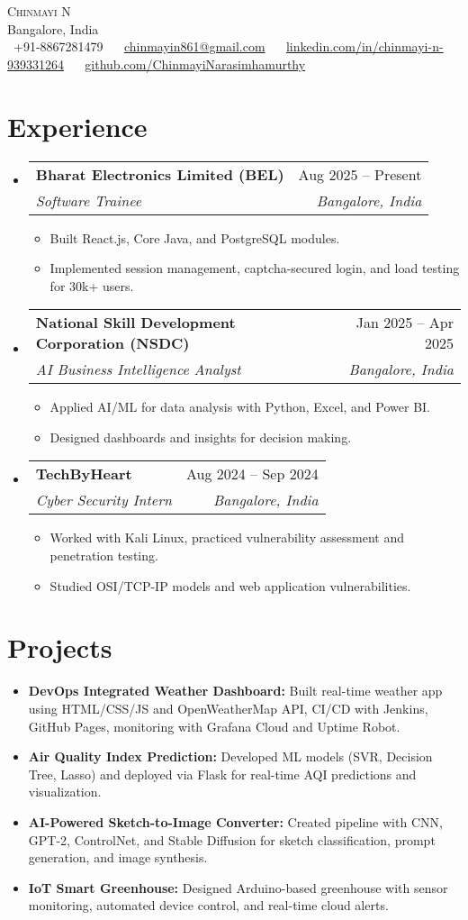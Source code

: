 \documentclass[a4paper,10pt]{article}
\makeatletter
\newcommand{\resumeItem}[1]{\item\small{#1}}
\newcommand{\resumeSubheading}[4]{
  \vspace{-1pt}\item
    \begin{tabular*}{0.97\textwidth}{l@{\extracolsep{\fill}}r}
      \textbf{#1} & #2 \\
      \textit{#3} & \textit{#4} \\
    \end{tabular*}\vspace{-5pt}
}
\newcommand{\resumeSubHeadingListStart}{\begin{itemize}[leftmargin=*]}
\newcommand{\resumeSubHeadingListEnd}{\end{itemize}}
\newcommand{\resumeItemListStart}{\begin{itemize}[label=\raisebox{0.25ex}{\tiny$\bullet$}]}
\newcommand{\resumeItemListEnd}{\end{itemize}\vspace{-5pt}}
\makeatother
\begin{document}
\begin{center}
    {\Huge \scshape Chinmayi N} \\ \vspace{2pt}
    Bangalore, India \\ \vspace{2pt}
    \scriptsize
    \faPhone\ +91-8867281479 ~ 
    \faEnvelope\ \href{mailto:chinmayin861@gmail.com}{chinmayin861@gmail.com} ~
    \faLinkedin\ \href{https://linkedin.com/in/chinmayi-n-939331264}{linkedin.com/in/chinmayi-n-939331264} ~
    \faGithub\ \href{https://github.com/ChinmayiNarasimhamurthy}{github.com/ChinmayiNarasimhamurthy}
    \vspace{-8pt}
\end{center}


\section{Experience}
  \resumeSubHeadingListStart
    \resumeSubheading
      {Bharat Electronics Limited (BEL)}{Aug 2025 -- Present}
      {Software Trainee}{Bangalore, India}
      \resumeItemListStart
        \resumeItem{Built React.js, Core Java, and PostgreSQL modules.}
        \resumeItem{Implemented session management, captcha-secured login, and load testing for 30k+ users.}
      \resumeItemListEnd

    \resumeSubheading
      {National Skill Development Corporation (NSDC)}{Jan 2025 -- Apr 2025}
      {AI Business Intelligence Analyst}{Bangalore, India}
      \resumeItemListStart
        \resumeItem{Applied AI/ML for data analysis with Python, Excel, and Power BI.}
        \resumeItem{Designed dashboards and insights for decision making.}
      \resumeItemListEnd

    \resumeSubheading
      {TechByHeart}{Aug 2024 -- Sep 2024}
      {Cyber Security Intern}{Bangalore, India}
      \resumeItemListStart
        \resumeItem{Worked with Kali Linux, practiced vulnerability assessment and penetration testing.}
        \resumeItem{Studied OSI/TCP-IP models and web application vulnerabilities.}
      \resumeItemListEnd
  \resumeSubHeadingListEnd

\section{Projects}
  \resumeSubHeadingListStart
    \resumeItem{\textbf{DevOps Integrated Weather Dashboard:} Built real-time weather app using HTML/CSS/JS and OpenWeatherMap API, CI/CD with Jenkins, GitHub Pages, monitoring with Grafana Cloud and Uptime Robot.}
    \resumeItem{\textbf{Air Quality Index Prediction:} Developed ML models (SVR, Decision Tree, Lasso) and deployed via Flask for real-time AQI predictions and visualization.}
    \resumeItem{\textbf{AI-Powered Sketch-to-Image Converter:} Created pipeline with CNN, GPT-2, ControlNet, and Stable Diffusion for sketch classification, prompt generation, and image synthesis.}
    \resumeItem{\textbf{IoT Smart Greenhouse:} Designed Arduino-based greenhouse with sensor monitoring, automated device control, and real-time cloud alerts.}
  \resumeSubHeadingListEnd
\end{document}
